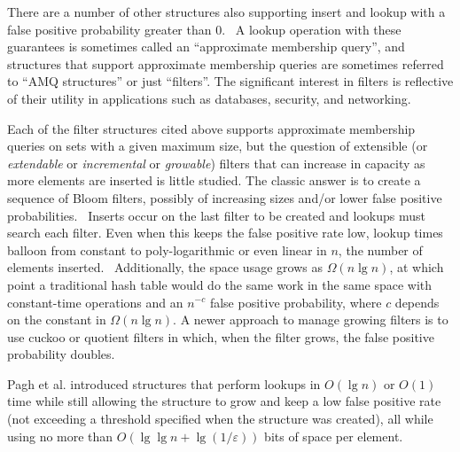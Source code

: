 \documentclass[letterpaper,twocolumn,10pt]{article}
\newcommand{\etal}{et al.}
\begin{document}
There are a number of other structures also supporting insert and lookup with a false positive probability greater than 0.~\cite{vacuum,morton-journal,ribbon,xor-filter,quotient-filter,broom,vector-quotient}
A lookup operation with these guarantees is sometimes called an ``approximate membership query'', and structures that support approximate membership queries are sometimes referred to ``AMQ structures'' or just ``filters''.
The significant interest in filters is reflective of their utility in applications such as databases, security, and networking.~\cite{split-bloom, vacuum, quotient-filter, malware, profile-similarity, invertible, flooding-filter, summary-cache, prefix-matching-filter}


Each of the filter structures cited above supports approximate membership queries on sets with a given maximum size, but the question of extensible (or {\itshape extendable} or {\itshape incremental} or {\itshape growable}) filters that can increase in capacity as more elements are inserted is little studied.
The classic answer is to create a sequence of Bloom filters, possibly of increasing sizes and/or lower false positive probabilities.~\cite{dynamic-bloom,scalable-bloom}
Inserts occur on the last filter to be created and lookups must search each filter.
Even when this keeps the false positive rate low, lookup times balloon from constant to poly-logarithmic or even linear in $n$, the number of elements inserted.~\cite{psw,logarithm,consistent-cuckoo} %
Additionally, the space usage grows as $\Omega(n \lg n)$, at which point a traditional hash table would do the same work in the same space with constant-time operations and an $n^{-c}$ false positive probability, where $c$ depends on the constant in $\Omega(n \lg n)$.
A newer approach to manage growing filters is to use cuckoo or quotient filters in which, when the filter grows, the false positive probability doubles.~\cite{logarithm,morton-journal,vacuum,rsqf}


Pagh \etal{} introduced structures that perform lookups in $O(\lg n)$ or $O(1)$ time while still allowing the structure to grow and keep a low false positive rate (not exceeding a threshold specified when the structure was created), all while using no more than $O(\lg \lg n + \lg (1/\varepsilon))$ bits of space per element.~\cite{psw}
\end{document}
